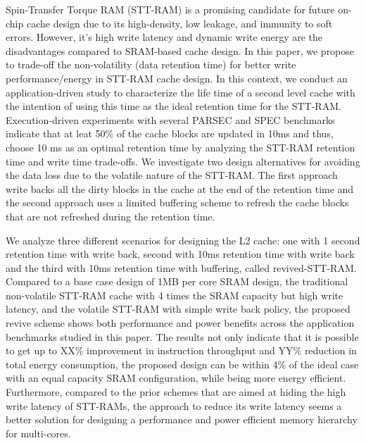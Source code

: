 Spin-Transfer Torque RAM (STT-RAM) is a promising candidate for future
on-chip cache design due to its high-density, low leakage, and immunity to
soft errors.  However, it's high write latency and dynamic
write energy are the disadvantages compared to SRAM-based cache design.
In this paper, we propose to trade-off the non-volatility (data retention time)
for better write performance/energy in STT-RAM cache design.
In this context, we conduct an application-driven study to characterize the
life time of a second level cache with the intention of using this time as the ideal
retention time for the STT-RAM. Execution-driven experiments with several PARSEC and SPEC benchmarks
indicate that at leat 50\% of the cache blocks are updated in 10ms and thus, choose 10 ms
as an optimal retention time by analyzing the STT-RAM retention time and write time trade-offs.
We investigate two design alternatives for avoiding the data loss due to the volatile nature of the
STT-RAM. The first approach write backs all the dirty blocks in the cache at the end of the retention time
and the second approach uses a limited buffering scheme to refresh the cache blocks that are not refreshed
during the retention time.

We analyze three different scenarios for designing the L2 cache: one with 1 second retention time with write back,
second with 10ms retention time with write back and the third with 10ms retention time with buffering, called
revived-STT-RAM. Compared to a base case design of 1MB per core SRAM design, the traditional non-volatile STT-RAM
cache with 4 times the SRAM capacity but high write latency, and the volatile STT-RAM with simple write back policy,
the proposed revive scheme shows both performance and power benefits across the application benchmarks studied in
this paper. The results not only indicate that it is possible to get up to XX\% improvement in instruction
throughput and YY\% reduction in total energy consumption, the proposed design can be within 4\% of the ideal case
with an equal capacity SRAM configuration, while being more energy efficient.
Furthermore, compared to the prior schemes that are aimed at hiding the high write latency of STT-RAMs,
the approach to reduce its write latency seems a better solution for designing a performance and power efficient
memory hierarchy for multi-cores.
